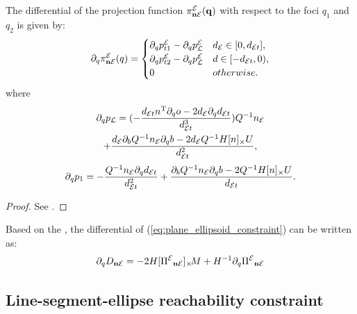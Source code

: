 \documentclass[10pt,twocolumn,twoside]{IEEEtran}
\begin{document}
  \begin{proposition}\label{prop:dpi_ne_dt}
    The differential of the projection function $\pi^{\mathcal{E}}_{\mathbf{n} \mathcal{E}}(\mathbf{q})$ with respect to the foci $q_1$ and $q_2$ is given by:
    \begin{equation}
      \partial_q \pi^{\mathcal{E}}_{\mathbf{n} \mathcal{E}}(q) = \begin{cases}
        \partial_q p^{\mathcal{E}}_{t1}-\partial_q p^{\mathcal{E}}_{\mathcal{L}} &  d_{\mathcal{E}} \in [0, d_{\mathcal{E} t}], \\
        \partial_q p^{\mathcal{E}}_{t2}-\partial_q p^{\mathcal{E}}_{\mathcal{L}} &  d \in [- d_{\mathcal{E} t},0), \\
        {0} & otherwise.
      \end{cases}
    \end{equation}
    where
    \begin{multline}
      \partial_q p_{\mathcal{L}} =   (-\frac{d_{\mathcal{E} t} n^\mathrm{T} \partial_q o -2d_{\mathcal{E}} \partial_q d_{\mathcal{E} t}}{d_{\mathcal{E} t}^3} )Q^{-1}n_{\mathcal{E}} \\
      + \frac{d_{\mathcal{E}}\partial_b Q^{-1} n_{\mathcal{E}} \partial_q b -  2d_{\mathcal{E}} Q^{-1}H[n]_\times U}{d_{\mathcal{E} t}^2},
    \end{multline}
    \begin{equation}
      \partial_q p_{1} =  -\frac{Q^{-1}n_{\mathcal{E}} \partial_q d_{\mathcal{E} t} }{d_{\mathcal{E} t}^2} 
      + \frac{\partial_b Q^{-1}n_{\mathcal{E}} \partial_q b -  2Q^{-1}H[n]_\times U }{d_{\mathcal{E} t}}.
    \end{equation}
  \end{proposition}
  \begin{proof}
  See .
  \end{proof}
  Based on the , the differential of (\ref{eq:plane_ellipsoid_constraint}) can be written as:
  \begin{equation}
    \partial_q {D_{\mathbf{n}\mathcal{E}}} = -2 H [{\Pi^{\mathcal{E}}}_{\mathbf{n} \mathcal{E}}]_{\times}\!  M + H^{-1}\partial_q {\Pi^{\mathcal{E}}}_{\mathbf{n} \mathcal{E}}
  \end{equation}

\subsection{Line-segment-ellipse reachability constraint}\label{chapter:ellipse to segment}
\end{document}
